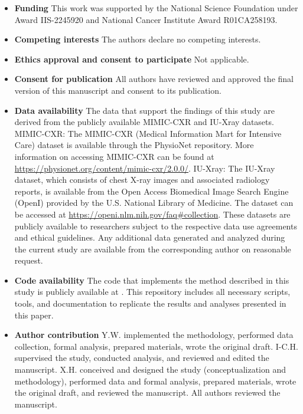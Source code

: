 \documentclass[sn-mathphys-num]{sn-jnl}%
\theoremstyle{thmstyleone}%
\theoremstyle{thmstyletwo}%
\theoremstyle{thmstylethree}%
\begin{document}
\begin{itemize}
\item \textbf{Funding}
This work was supported by the National Science Foundation under Award IIS-2245920 and National Cancer Institute Award R01CA258193.

\item \textbf{Competing interests} 
The authors declare no competing interests.

\item \textbf{Ethics approval and consent to participate} Not applicable.

\item \textbf{Consent for publication}
All authors have reviewed and approved the final version of this manuscript and consent to its publication.

\item \textbf{Data availability}
The data that support the findings of this study are derived from the publicly available MIMIC-CXR and IU-Xray datasets.
MIMIC-CXR: The MIMIC-CXR (Medical Information Mart for Intensive Care) dataset is available through the PhysioNet repository. More information on accessing MIMIC-CXR can be found at \url{https://physionet.org/content/mimic-cxr/2.0.0/}.
IU-Xray: The IU-Xray dataset, which consists of chest X-ray images and associated radiology reports, is available from the Open Access Biomedical Image Search Engine (OpenI) provided by the U.S. National Library of Medicine. The dataset can be accessed at \url{https://openi.nlm.nih.gov/faq#collection}.
These datasets are publicly available to researchers subject to the respective data use agreements and ethical guidelines. Any additional data generated and analyzed during the current study are available from the corresponding author on reasonable request.



\item \textbf{Code availability}
The code that implements the method described in this study is publicly available at .
This repository includes all necessary scripts, tools, and documentation to replicate the results and analyses presented in this paper. 

\item \textbf{Author contribution}
Y.W. implemented the methodology, performed data collection, formal analysis, prepared materials, wrote the original draft.
I-C.H. supervised the study, conducted analysis, and reviewed and edited the manuscript.
X.H. conceived and designed the study (conceptualization and methodology), performed data and formal analysis, prepared materials, wrote the original draft, and reviewed the manuscript.
All authors reviewed the manuscript.
\end{itemize}
\end{document}
